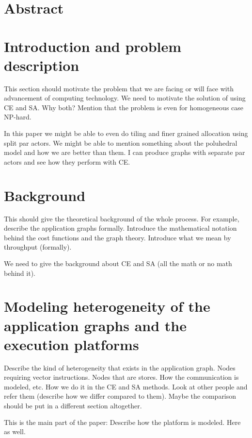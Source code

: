 \documentclass[10pt]{article}
\begin{document}
\section{Abstract}
\label{sec:abstract-2}

\section{Introduction and problem description}
\label{sec:intr-probl-descr}

This section should motivate the problem that we are facing or will face
with advancement of computing technology. We need to motivate the
solution of using CE and SA. Why both? Mention that the problem is even
for homogeneous case NP-hard.

In this paper we might be able to even do tiling and finer grained
allocation using split par actors. We might be able to mention something
about the poluhedral model and how we are better than them. I can
produce graphs with separate par actors and see how they perform with
CE.

\section{Background}
\label{sec:background}

This should give the theoretical background of the whole process. For
example, describe the application graphs formally. Introduce the
mathematical notation behind the cost functions and the graph
theory. Introduce what we mean by throughput (formally).

We need to give the background about CE and SA (all the math or no math
behind it).

\section{Modeling heterogeneity of the application graphs and the
  execution platforms}
\label{sec:model-heter-appl}

Describe the kind of heterogeneity that exists in the application
graph. Nodes requiring vector instructions. Nodes that are stores. How
the communication is modeled, etc. How we do it in the CE and SA
methods. Look at other people and refer them (describe how we differ
compared to them). Maybe the comparison should be put in a different
section altogether.

This is the main part of the paper: Describe how the platform is
modeled. Here as well.
\end{document}
